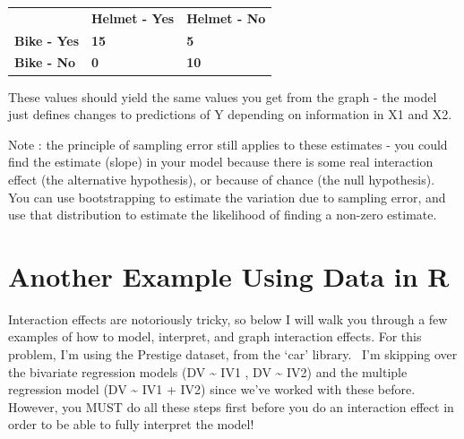 \documentclass[
  letterpaper,
  DIV=11,
  numbers=noendperiod,
  oneside]{scrreprt}
\begin{document}
\begin{tcolorbox}[enhanced jigsaw, toptitle=1mm, toprule=.15mm, rightrule=.15mm, breakable, left=2mm, colbacktitle=quarto-callout-tip-color!10!white, colback=white, opacityback=0, coltitle=black, bottomtitle=1mm, opacitybacktitle=0.6, titlerule=0mm, leftrule=.75mm, arc=.35mm, bottomrule=.15mm, title=\textcolor{quarto-callout-tip-color}{\faLightbulb}\hspace{0.5em}{Example Model}, colframe=quarto-callout-tip-color-frame]

\begin{longtable}[]{@{}lll@{}}
\toprule\noalign{}
\endhead
\bottomrule\noalign{}
\endlastfoot
& \textbf{Helmet - Yes} & \textbf{Helmet - No} \\
\textbf{Bike - Yes} & \textbf{15} & \textbf{5} \\
\textbf{Bike - No} & \textbf{0} & \textbf{10} \\
\end{longtable}

These values should yield the same values you get from the graph - the
model just defines changes to predictions of Y depending on information
in X1 and X2.

Note : the principle of sampling error still applies to these estimates
- you could find the estimate (slope) in your model because there is
some real interaction effect (the alternative hypothesis), or because of
chance (the null hypothesis). You can use bootstrapping to estimate the
variation due to sampling error, and use that distribution to estimate
the likelihood of finding a non-zero estimate.

\end{tcolorbox}

\section{Another Example Using Data in
R}\label{another-example-using-data-in-r}

Interaction effects are notoriously tricky, so below I will walk you
through a few examples of how to model, interpret, and graph interaction
effects. For this problem, I'm using the Prestige dataset, from the
`car' library.~ I'm skipping over the bivariate regression models (DV
\textasciitilde{} IV1 , DV \textasciitilde{} IV2) and the multiple
regression model (DV \textasciitilde{} IV1 + IV2) since we've worked
with these before. However, you MUST do all these steps first before you
do an interaction effect in order to be able to fully interpret the
model!
\end{document}

